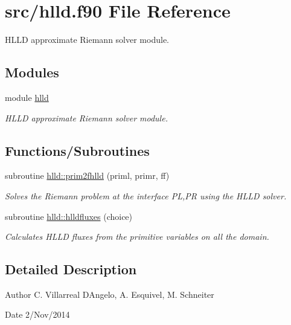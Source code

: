 \hypertarget{hlld_8f90}{}\section{src/hlld.f90 File Reference}
\label{hlld_8f90}


H\+L\+L\+D approximate Riemann solver module.  


\subsection*{Modules}
\begin{DoxyCompactItemize}
\item 
module \hyperlink{namespacehlld}{hlld}
\begin{DoxyCompactList}\small\item\em H\+L\+L\+D approximate Riemann solver module. \end{DoxyCompactList}\end{DoxyCompactItemize}
\subsection*{Functions/\+Subroutines}
\begin{DoxyCompactItemize}
\item 
subroutine \hyperlink{namespacehlld_adb0dbc5abe3e062f2ee4e333c6794bc8}{hlld\+::prim2fhlld} (priml, primr, ff)
\begin{DoxyCompactList}\small\item\em Solves the Riemann problem at the interface P\+L,P\+R using the H\+L\+L\+D solver. \end{DoxyCompactList}\item 
subroutine \hyperlink{namespacehlld_a2640822e1b56d5b174f6293c26d75e22}{hlld\+::hlldfluxes} (choice)
\begin{DoxyCompactList}\small\item\em Calculates H\+L\+L\+D fluxes from the primitive variables on all the domain. \end{DoxyCompactList}\end{DoxyCompactItemize}


\subsection{Detailed Description}
\begin{DoxyAuthor}{Author}
C. Villarreal D\textquotesingle{}Angelo, A. Esquivel, M. Schneiter 
\end{DoxyAuthor}
\begin{DoxyDate}{Date}
2/\+Nov/2014 
\end{DoxyDate}
